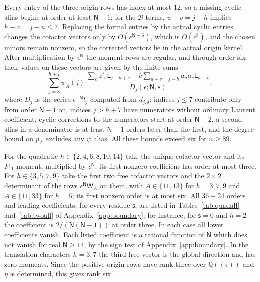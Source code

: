 \documentclass{amsart}
\theoremstyle{definition}
\theoremstyle{remark}
\numberwithin{equation}{section}
\newcommand{\QQ}{\mathbb{Q}}
\begin{document}
Every entry of the three origin rows has index at most $12$, so a missing cyclic alias
begins at order at least $\mathsf N-1$; for the $\bar{\mathcal B}$ terms, $u-v=j-h$
implies $h-v=j-u\le7$. Replacing the formal entries by the actual cyclic entries changes
the cofactor vectors only by $O(\epsilon^{\mathsf N-6})$, which is $O(\epsilon^8)$, and
the chosen minors remain nonzero, so the corrected vectors lie in the actual origin
kernel. After multiplication by $\epsilon^{\mathsf N}$ the moment rows are regular, and
through order six their values on these vectors are given by the finite sums
\begin{equation}\label{eq:finitesum}
  \sum_{j=8}^{h+7}\psi_A(j)\,
  \frac{\sum_ez'_e\mathsf L_{j-h+e}-\bar c\sum_{u-v=j-h}a_ua_v\mathsf L_{h-v}}
  {D_j(\epsilon;\mathsf N,\mathsf s)},
\end{equation}
where $D_j$ is the series $\epsilon^{-\mathsf N}l_j$ computed from $d_{j,\delta}$:
indices $j\le7$ contribute only from order $\mathsf N-1$ on, indices $j>h+7$ have
numerators without ordinary Laurent coefficient, cyclic corrections to the
numerators start at order $\mathsf N-2$, a second alias in a denominator is at least
$\mathsf N-1$ orders later than the first, and the degree bound on $p_A$ excludes any
$\psi$ alias. All these bounds exceed six for $n\ge89$.

For the quadratic $h\in\{2,4,6,8,10,14\}$ take the unique cofactor vector and its
$P_{11}$ moment, multiplied by $\epsilon^{\mathsf N}$; its first nonzero coefficient has
order at most three. For $h\in\{3,5,7,9\}$ take the first two free cofactor vectors and
the $2\times2$ determinant of the rows $\epsilon^{\mathsf N}\mathsf W_A$ on them, with
$A\in\{11,13\}$ for $h=3,7,9$ and $A\in\{11,33\}$ for $h=5$; its first nonzero order is at
most six. All $36+24$ orders and leading coefficients, for every residue $\mathsf s$, are
listed in Tables~\ref{tab:quadall} and~\ref{tab:twoall} of Appendix~\ref{app:boundary};
for instance, for $\mathsf s=0$ and $h=2$ the coefficient is
$2/(\mathsf N(\mathsf N-1))$ at order three. In each case all lower coefficients vanish.
Each listed coefficient is a rational function of $\mathsf N$ which does not vanish for
real $\mathsf N\ge14$, by the sign test of Appendix~\ref{app:boundary}. In the translation
characters $h=3,7$ the third free vector is the global direction and has zero moments.
Since the positive origin rows have rank three over $\QQ((\epsilon))$ and $\eta$ is
determined, this gives rank six.
\end{document}
